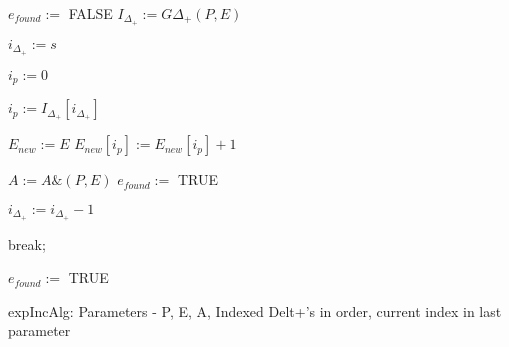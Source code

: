 \documentclass[../paper.tex]{subfiles}
\begin{document}
\begin{algorithmic}

\STATE $e_{found} :=$ FALSE
\STATE $I_{\Delta_{+}} := G{ \Delta_{+}}(P,E)$

\STATE $i_{\Delta_{+}} := s$ %

\STATE $i_p := 0$ %

	\STATE $i_p := I_{\Delta_{+}}[ i_{\Delta_{+}} ]$


		\STATE {}
		\STATE $E_{new} := E$
		\STATE $E_{new}[ i_p ] := E_{new}[ i_p ] + 1 $
		
			\STATE $A := A\&(P,E)$
			\STATE $e_{found} := $ TRUE
		\ENDIF

		\STATE $i_{\Delta_{+}} := i_{\Delta_{+}} - 1$  
	
	\ELSE
		\STATE break;
	\ENDIF
\ENDWHILE


	\STATE {}
		\STATE $e_{found} := $ TRUE
	\ENDIF
\ENDIF

\end{algorithmic}
expIncAlg: Parameters - P, E, A, Indexed Delt+'s in order, current index
in last parameter
\end{document}
